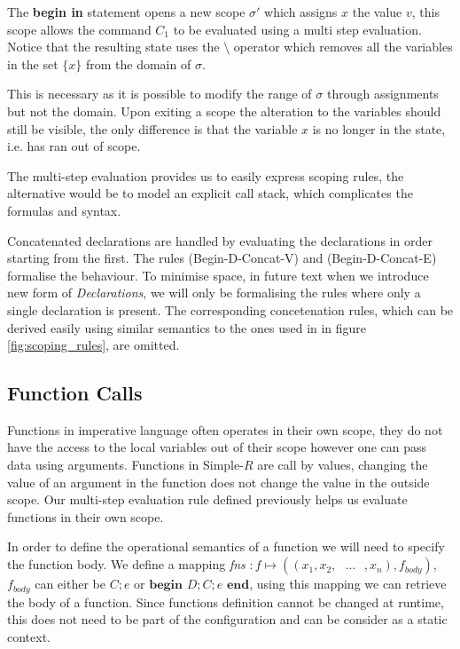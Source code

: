 \documentclass[a4paper,12pt]{report}
\begin{document}
\par
The \textbf{begin in} statement opens a new scope $\sigma'$ which 
assigns $x$ the value $v$, this scope allows the command $C_1$ to be evaluated 
using a multi step evaluation. Notice that the resulting state 
uses the $\setminus$ operator which removes all the variables 
in the set $\{x\}$ from the domain of $\sigma$. 

\par
This is necessary as it is possible to modify the range of $\sigma$ through 
assignments but not the domain. Upon exiting a scope the alteration to the variables  
should still be visible, the only difference is that the variable $x$ is no longer in 
the state, i.e. has ran out of scope.

\par
The multi-step evaluation provides us to easily express scoping rules, 
the alternative would be to model an explicit call stack, which complicates the 
formulas and syntax.

\par
Concatenated declarations are handled by evaluating the declarations in order 
starting from the first. The rules (Begin-D-Concat-V) and (Begin-D-Concat-E) 
formalise the behaviour. To minimise space, in future text when we 
introduce new form of \textit{Declarations}, we will only 
be formalising the rules where only a single declaration is present. The 
corresponding concetenation rules, which can be derived easily using  
similar semantics to the ones used in in figure \ref{fig:scoping_rules}, 
are omitted.

\subsection{Function Calls} \label{section:functions_sos}
Functions in imperative language often operates in their own scope, they 
do not have the access to the local variables out of their scope however 
one can pass data using arguments. Functions in Simple-$R$ are call by values, 
changing the value of an argument in the function does not change the value in 
the outside scope. Our multi-step evaluation rule defined previously helps us 
evaluate functions in their own scope. 

\par
In order to define the operational semantics of a function we will need to 
specify the function body. We define a mapping 
\textit{fns} $: f \mapsto ((x_1, x_2,\text{ }...\text{ },x_n), f_{body})$, 
$f_{body}$ can either be $C;e$ or $\textbf{begin }D;C;e\textbf{ end}$, 
using this mapping we can retrieve the body of a function. Since functions 
definition cannot be changed at runtime, this does not need to be part of the 
configuration and can be consider as a static context.
\end{document}
